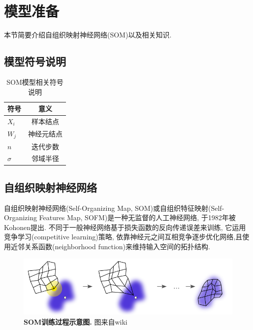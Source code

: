 
\section{模型准备}
\label{sec:preliminary}
本节简要介绍自组织映射神经网络(SOM)以及相关知识.

\subsection{模型符号说明}

\begin{table}[h]
	\begin{center}
		\caption{SOM模型相关符号说明}
		\begin{tabular}{l|c}
			\toprule[2pt] 
			    符号 & 意义 \\ \hline
			 $X_i$& 样本结点\\
       $W_j$&神经元结点\\
       $n$&迭代步数\\
       $\sigma$&邻域半径\\


			\toprule[2pt] 
		\end{tabular}
		
		\label{tab:distribution}
		\vspace{-0.4cm}
	\end{center}
\end{table}


\subsection{自组织映射神经网络}
\label{sec:som}
自组织映射神经网络(Self-Organizing Map, SOM)或自组织特征映射(Self-Organizing Features Map, SOFM)是一种无监督的人工神经网络, 于1982年被Kohonen提出\cite{som}. 不同于一般神经网络基于损失函数的反向传递误差来训练, 它运用竞争学习(competitive learning)策略, 依靠神经元之间互相竞争逐步优化网络,且使用近邻关系函数(neighborhood function)来维持输入空间的拓扑结构.

\begin{figure}[h]
    \begin{center}
        \includegraphics[width=0.6\linewidth]{fig/som1}
    \end{center}
    \caption{\textbf{SOM训练过程示意图.} 图来自wiki}
        \label{fig:plan}
  \end{figure}

